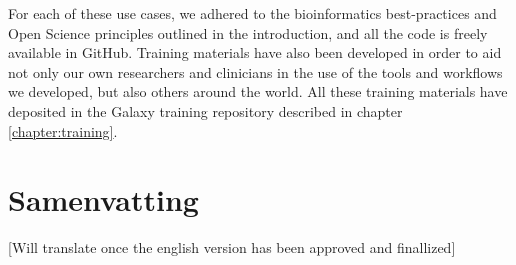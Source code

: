For each of these use cases, we adhered to the bioinformatics best-practices and Open Science principles outlined in the introduction, and all the code is freely available in GitHub. Training materials have also been developed in order to aid not only our own researchers and clinicians in the use of the tools and workflows we developed, but also others around the world. All these training materials have deposited in the Galaxy training repository described in chapter \ref{chapter:training}.


\section{Samenvatting}

[Will translate once the english version has been approved and finallized]
